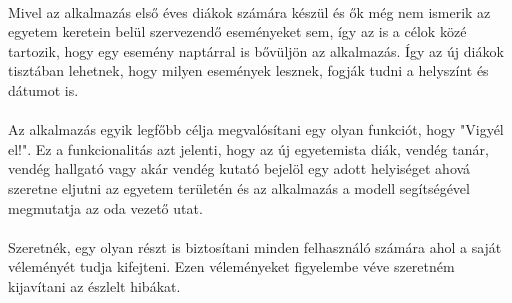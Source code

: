 	\paragraph{}
	Mivel az alkalmazás első éves diákok számára készül és ők még nem ismerik az egyetem keretein belül szervezendő eseményeket sem, így az is a célok közé tartozik, hogy egy esemény naptárral is bővüljön az alkalmazás. Így az új diákok tisztában lehetnek, hogy milyen események lesznek, fogják tudni a helyszínt és dátumot is.
	\paragraph{}
	Az alkalmazás egyik legfőbb célja megvalósítani egy olyan funkciót, hogy "Vigyél el!". Ez a funkcionalitás azt jelenti, hogy az új egyetemista diák, vendég tanár, vendég hallgató vagy akár vendég kutató bejelöl egy adott helyiséget ahová szeretne eljutni az egyetem területén és az alkalmazás a modell segítségével megmutatja az oda vezető utat.
	\paragraph{}
	Szeretnék, egy olyan részt is biztosítani minden felhasználó számára ahol a saját véleményét tudja kifejteni. Ezen véleményeket figyelembe véve szeretném kijavítani az észlelt hibákat.